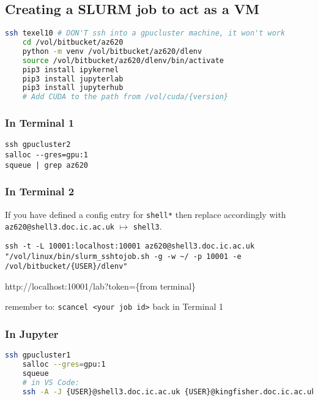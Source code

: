 \documentclass[11pt]{article}
\begin{document}
\subsection{Creating a SLURM job to act as a VM}

\begin{lstlisting}[language=bash]
    ssh texel10 # DON'T ssh into a gpucluster machine, it won't work
    cd /vol/bitbucket/az620
    python -m venv /vol/bitbucket/az620/dlenv
    source /vol/bitbucket/az620/dlenv/bin/activate  
    pip3 install ipykernel
    pip3 install jupyterlab
    pip3 install jupyterhub
    # Add CUDA to the path from /vol/cuda/{version}
\end{lstlisting}

\subsubsection{In Terminal 1}
\begin{lstlisting}
ssh gpucluster2
salloc --gres=gpu:1
squeue | grep az620
\end{lstlisting}

\subsubsection{In Terminal 2}
If you have defined a config entry for \texttt{shell*} then replace accordingly with \texttt{az620@shell3.doc.ic.ac.uk} $\mapsto$ \texttt{shell3}.
\begin{lstlisting}
ssh -t -L 10001:localhost:10001 az620@shell3.doc.ic.ac.uk "/vol/linux/bin/slurm_sshtojob.sh -g -w ~/ -p 10001 -e /vol/bitbucket/{USER}/dlenv"
\end{lstlisting}

http://localhost:10001/lab?token=\{from terminal\}

\begin{warning}
    remember to:
    \texttt{scancel <your job id>} back in Terminal 1
\end{warning}

\subsubsection{In Jupyter}

\begin{lstlisting}[language=bash]
    ssh gpucluster1
    salloc --gres=gpu:1
    squeue
    # in VS Code:
    ssh -A -J {USER}@shell3.doc.ic.ac.uk {USER}@kingfisher.doc.ic.ac.uk
\end{lstlisting}
\end{document}
